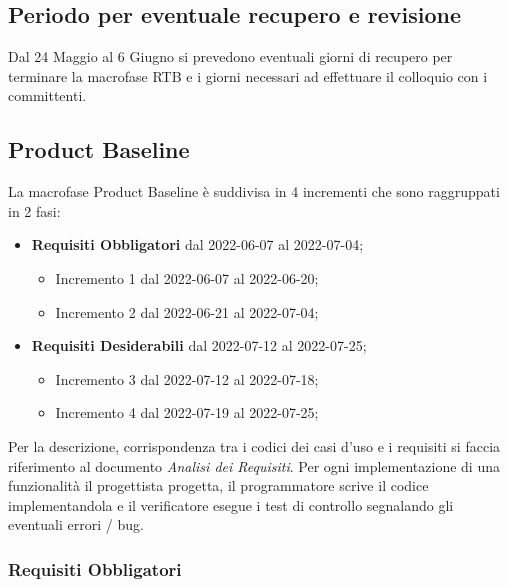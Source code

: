 \subsection*{Periodo per eventuale recupero e revisione}
Dal 24 Maggio al 6 Giugno si prevedono eventuali giorni di recupero per terminare la macrofase RTB e i giorni necessari ad effettuare il colloquio con i committenti.

\subsection{Product Baseline}
La macrofase Product Baseline è suddivisa in 4 incrementi che sono raggruppati in 2 fasi:
\begin{itemize}
    \item \textbf{Requisiti Obbligatori} dal 2022-06-07 al 2022-07-04;
            \begin{itemize}
                \item Incremento 1 dal 2022-06-07 al 2022-06-20;
                \item Incremento 2 dal 2022-06-21 al 2022-07-04;
            \end{itemize}
    \item \textbf{Requisiti Desiderabili} dal 2022-07-12 al 2022-07-25;
            \begin{itemize}
                \item Incremento 3 dal 2022-07-12 al 2022-07-18;
                \item Incremento 4 dal 2022-07-19 al 2022-07-25;
            \end{itemize}
\end{itemize}
Per la descrizione, corrispondenza tra i codici dei casi d'uso e i requisiti si faccia riferimento al documento \emph{Analisi dei Requisiti}. \newline
Per ogni implementazione di una funzionalità il progettista progetta, il programmatore scrive il codice implementandola e il verificatore esegue i test di controllo segnalando gli eventuali errori / bug.
\subsubsection{Requisiti Obbligatori}
